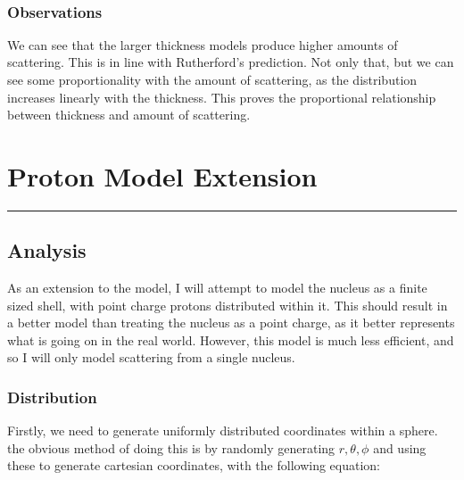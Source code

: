 \documentclass[11pt]{article}
\begin{document}
    \begin{center}
    \end{center}
    { \hspace*{\fill} \\}
    
    \hypertarget{observations}{%
\subsubsection*{Observations}\label{observations}}

We can see that the larger thickness models produce higher amounts of
scattering. This is in line with Rutherford's prediction. Not only that,
but we can see some proportionality with the amount of scattering, as
the distribution increases linearly with the thickness. This proves the
proportional relationship between thickness and amount of scattering.

\pagebreak
    \hypertarget{proton-model-extension}{%
\section{Proton Model Extension}\label{proton-model-extension}}

\begin{center}\rule{0.5\linewidth}{0.5pt}\end{center}

\hypertarget{analysis}{%
\subsection{Analysis}\label{analysis}}

As an extension to the model, I will attempt to model the nucleus as a
finite sized shell, with point charge protons distributed within it.
This should result in a better model than treating the nucleus as a
point charge, as it better represents what is going on in the real
world. However, this model is much less efficient, and so I will only
model scattering from a single nucleus.

\hypertarget{distribution}{%
\subsubsection{Distribution}\label{distribution}}

Firstly, we need to generate uniformly distributed coordinates within a
sphere. the obvious method of doing this is by randomly generating
\(r, \theta, \phi\) and using these to generate cartesian coordinates,
with the following equation:
\end{document}
